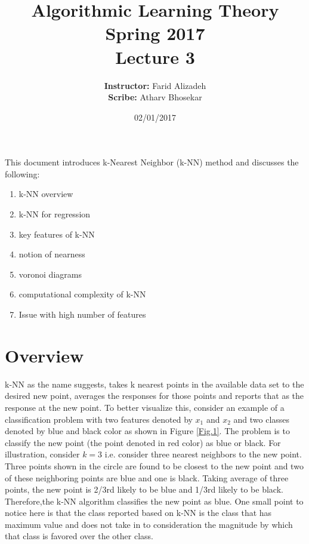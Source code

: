\documentclass{article}
\title{ 
Algorithmic Learning Theory\\
Spring 2017\\
Lecture 3 %
}
\author{
{\bf Instructor:} Farid Alizadeh\\
{\bf Scribe:} Atharv Bhosekar
}
\date{02/01/2017} %
\begin{document}
\pagestyle{fancy}

\maketitle
%
\oddsidemargin 0.0in 
\textwidth 6.25in 
\topmargin -0.25in 
\textheight 8.25in    


\medskip

This document introduces k-Nearest Neighbor (k-NN) method and discusses the following:  
\begin{enumerate}
\item k-NN overview 
\item k-NN for regression
\item key features of k-NN
\item notion of nearness
\item voronoi diagrams
\item computational complexity of k-NN
\item Issue with high number of features
\end{enumerate}

\section{Overview} %
k-NN as the name suggests, takes k nearest points in the available data set to the desired new point, averages the responses for those points and reports that as the response at the new point. To better visualize this, consider an example of a classification problem with two features denoted by $x_1$ and $x_2$ and two classes denoted by blue and black color as shown in Figure \ref{Fig.1}. The problem is to classify the new point (the point denoted in red color) as blue or black. For illustration, consider $k = 3$ i.e. consider three nearest neighbors to the new point. Three points shown in the circle are found to be closest to the new point and two of these neighboring points are blue and one is black. Taking average of three points, the new point is 2/3rd likely to be blue and 1/3rd likely to be black. Therefore,the k-NN algorithm classifies the new point as blue. One small point to notice here is that the class reported based on k-NN is the class that has maximum value and does not take in to consideration the magnitude by which that class is favored over the other class.
\end{document}
